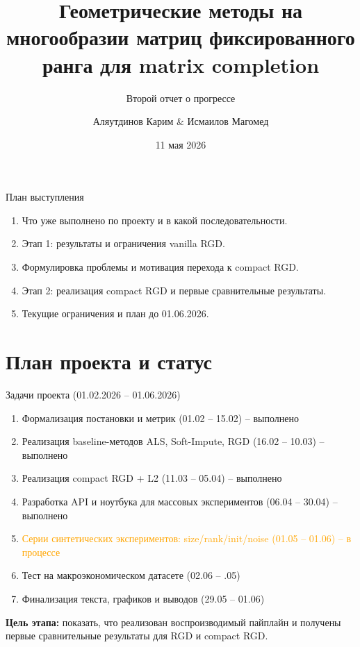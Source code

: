 \documentclass[aspectratio=169,xcolor=dvipsnames]{beamer}
\title{Геометрические методы на многообразии матриц фиксированного ранга для matrix completion}
\subtitle{Второй отчет о прогрессе}
\author{Аляутдинов Карим \& Исмаилов Магомед}
\institute{НИУ ВШЭ}
\date{11 мая 2026}
\begin{document}
\begin{frame}
    \titlepage
\end{frame}

\begin{frame}{План выступления}
    \small
    \begin{enumerate}
        \item Что уже выполнено по проекту и в какой последовательности.
        \item Этап 1: результаты и ограничения vanilla RGD.
        \item Формулировка проблемы и мотивация перехода к compact RGD.
        \item Этап 2: реализация compact RGD и первые сравнительные результаты.
        \item Текущие ограничения и план до 01.06.2026.
    \end{enumerate}
\end{frame}

\section{План проекта и статус}

\begin{frame}{Задачи проекта (01.02.2026 -- 01.06.2026)}
    \footnotesize
    \begin{enumerate}
        \item \textcolor{green!70!black}{Формализация постановки и метрик (01.02 -- 15.02) -- выполнено}
        \item \textcolor{green!70!black}{Реализация baseline-методов ALS, Soft-Impute, RGD (16.02 -- 10.03) -- выполнено}
        \item \textcolor{green!70!black}{Реализация compact RGD + L2 (11.03 -- 05.04) -- выполнено}
        \item \textcolor{green!70!black}{Разработка API и ноутбука для массовых экспериментов (06.04 -- 30.04) -- выполнено}
        \item \textcolor{orange}{Серии синтетических экспериментов: size/rank/init/noise (01.05 -- 01.06) -- в процессе}
        \item Тест на макроэкономическом датасете (02.06 -- .05)
        \item Финализация текста, графиков и выводов (29.05 -- 01.06)
    \end{enumerate}
    \vspace{0.3cm}
    \textbf{Цель этапа:} показать, что реализован воспроизводимый пайплайн и получены первые сравнительные результаты для RGD и compact RGD.
\end{frame}
\end{document}
